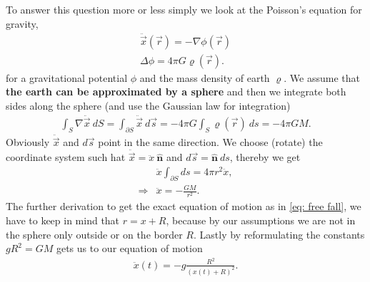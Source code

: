 To answer this question more or less simply we look at the Poisson's equation
for gravity,
\begin{align}
    \ddot{\vec{x}}(\vec{r}) = -\nabla \phi(\vec{r}) \\
    \Delta \phi = 4\pi G\varrho(\vec{r}).
\end{align}
for a gravitational potential $\phi$ and the mass density of earth
$\varrho$. We assume that \textbf{the earth can be approximated by a sphere}
and then we integrate both sides along the sphere (and use the Gaussian law
for integration)
\begin{align}
    \int_{S} \nabla \ddot{\vec{x}}\ dS =
    \int_{\partial S}\ddot{\vec{x}}\ d\vec{s} = -4\pi
    G \int_S\varrho(\vec{r})\ ds = -4\pi GM.
\end{align}
Obviously $\ddot{\vec{x}}$ and $d\vec{s}$ point in the same direction. We
choose (rotate) the coordinate system such hat $\ddot{\vec{x}} =
\ddot{x}\ \mathbf{\hat{n}}$ and $d\vec{s} = \mathbf{\hat{n}}\ ds$, thereby
we get
\begin{align}
    &\ddot{x}\int_{\partial S} ds = 4\pi r^2 \ddot{x},\\
    \Rightarrow &\ddot{x} = -\frac{GM}{r^2}.
\end{align}
The further derivation to get the exact equation of motion as in \ref{eq:
free fall}, we have to keep in mind that $r = x + R$, because by our
assumptions we are not in the sphere only outside or on the border $R$.
Lastly by reformulating the constants $gR^2 = GM$ gets us to our equation of
motion
\begin{align}
    \ddot{x}(t) = -g\frac{R^2}{(x(t) + R)^2}.
\end{align}

